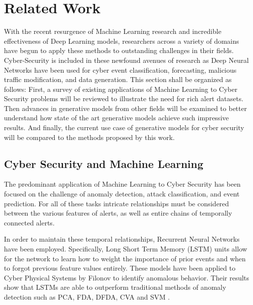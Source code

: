%
%
%

\chapter{Related Work}

With the recent resurgence of Machine Learning research and incredible effectiveness of Deep Learning models, researchers across a variety of domains have begun to apply these methods to outstanding challenges in their fields. Cyber-Security is included in these newfound avenues of research as Deep Neural Networks have been used for cyber event classification, forecasting, malicious traffic modification, and data generation. This section shall be organized as follows: First, a survey of existing applications of Machine Learning to Cyber Security problems will be reviewed to illustrate the need for rich alert datasets. Then advances in generative models from other fields will be examined to better understand how state of the art generative models achieve such impressive results. And finally, the current use case of generative models for cyber security will be compared to the methods proposed by this work. 

\section{Cyber Security and Machine Learning}

The predominant application of Machine Learning to Cyber Security has been focused on the challenge of anomaly detection, attack classification, and event prediction. For all of these tasks intricate relationships must be considered between the various features of alerts, as well as entire chains of temporally connected alerts. 

In order to maintain these temporal relationships, Recurrent Neural Networks have been employed. Specifically, Long Short Term Memory (LSTM) units allow for the network to learn how to weight the importance of prior events and when to forgot previous feature values entirely. These models have been applied to Cyber Physical Systems by Filonov \etal to identify anomalous behavior. Their results show that LSTMs are able to outperform traditional methods of anomaly detection such as PCA, FDA, DFDA, CVA and SVM \cite{Filonov2016, Filonov2017}.

